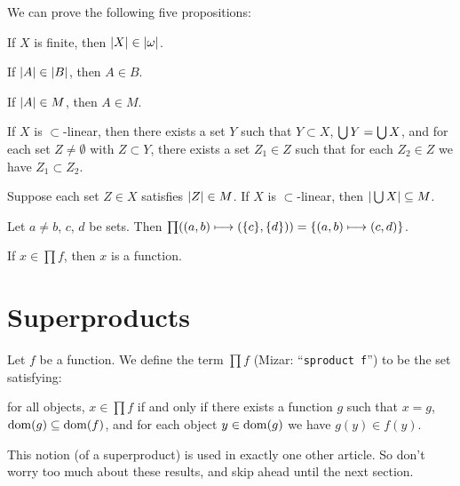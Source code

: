 \documentclass{article}
\begin{document}
We can prove the following five propositions:
\begin{thm}
\item\label{card3:42} If $X$ is finite, then $|X|\in|\omega|$.
\item\label{card3:43} If $|A|\in|B|$, then $A\in B$.
\item\label{card3:44} If $|A|\in M$, then $A\in M$.
\item\label{card3:45} If $X$ is $\subset$-linear, then there exists a
  set $Y$ such that $Y\subset X$, $\bigcup Y=\bigcup X$, and for each set
  $Z\neq\emptyset$ with $Z\subset Y$, there exists a set $Z_{1}\in Z$
  such that for each $Z_{2}\in Z$ we have $Z_{1}\subset Z_{2}$.
\item\label{card3:46} Suppose each set $Z\in X$ satisfies $|Z|\in M$.
  If $X$ is $\subset$-linear, then $|\bigcup X|\subseteq M$.
\item\label{card3:47} Let $a\neq b$, $c$, $d$ be sets. Then $\prod((a,b)\longmapsto(\{c\},\{d\}))=\{(a,b)\longmapsto(c,d)\}$.
\item\label{card3:48} If $x\in\prod f$, then $x$ is a function.
\end{thm}

\section{Superproducts}

\begin{definition}
Let $f$ be a function.
We define the term $\prod f$ (Mizar: ``\verb#sproduct f#'') to be the
set satisfying:
\begin{defn}
\item for all objects, $x\in\prod f$ if and only if there exists a
  function $g$ such that $x=g$, $\operatorname{dom}(g)\subseteq\operatorname{dom}(f)$, and for each
  object $y\in\operatorname{dom}(g)$ we have $g(y)\in f(y)$.
\end{defn}
\end{definition}

\begin{remark}
This notion (of a superproduct) is used in exactly one other article. So
don't worry too much about these results, and skip ahead until the next
section. 
\end{remark}
\end{document}
